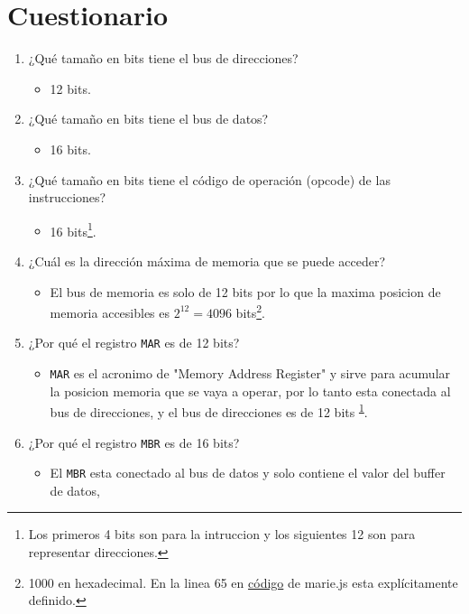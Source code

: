 \documentclass[12pt]{article}
\begin{document}
\section*{Cuestionario}
\label{sec:org7ae24a0}
\begin{enumerate}
\item ¿Qué tamaño en bits tiene el bus de direcciones?
\begin{itemize}
\item 12 bits.
\end{itemize}

\item ¿Qué tamaño en bits tiene el bus de datos?
\begin{itemize}
\item 16 bits.
\end{itemize}

\item ¿Qué tamaño en bits tiene el código de operación (opcode) de las instrucciones?
\begin{itemize}
\item 16 bits\footnote{Los primeros 4 bits son para la intruccion y los siguientes 12 son para representar direcciones.\label{org5c1096b}}.
\end{itemize}

\item ¿Cuál es la dirección máxima de memoria que se puede acceder?
\begin{itemize}
\item El bus de memoria es solo de 12 bits por lo que la maxima posicion de memoria accesibles es \(2^12 = 4096\) bits\footnote{1000 en hexadecimal. En la linea 65 en \href{https://github.com/MARIE-js/MARIE.js/blob/master/src/js/marie.js}{código} de marie.js esta explícitamente definido.}.
\end{itemize}

\item ¿Por qué el registro \texttt{MAR} es de 12 bits?
\begin{itemize}
\item \texttt{MAR} es el acronimo de "Memory Address Register" y sirve para acumular la posicion memoria que se vaya a operar, por lo tanto esta conectada al bus de direcciones, y el bus de direcciones es de 12 bits \textsuperscript{\ref{org5c1096b}}.
\end{itemize}

\item ¿Por qué el registro \texttt{MBR} es de 16 bits?
\begin{itemize}
\item El \texttt{MBR} esta conectado al bus de datos y solo contiene el valor del buffer de datos,
\end{itemize}
\end{enumerate}
\end{document}
